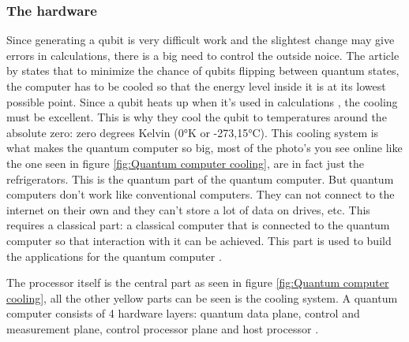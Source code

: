 \subsubsection{The hardware}
Since generating a qubit is very difficult work and the slightest change may give errors in calculations, there is a big need to control the outside noice.
The article by \textcite{Cooling} states that to minimize the chance of qubits flipping between quantum states, the computer has to be cooled so that the energy level inside it is at its lowest possible point.
Since a qubit heats up when it's used in calculations \autocite{Cooling}, the cooling must be excellent. This is why they cool the qubit to temperatures around the absolute zero: zero degrees Kelvin (0°K or -273,15°C).
This cooling system is what makes the quantum computer so big, most of the photo's you see online like the one seen in figure \ref{fig:Quantum computer cooling}, are in fact just the refrigerators. This is the quantum part of the quantum computer. But quantum computers don't work like conventional computers. They can not connect to the internet on their own and they can't store a lot of data on drives, etc.
This requires a classical part: a classical computer that is connected to the quantum computer so that interaction with it can be achieved. This part is used to build the applications for the quantum computer \autocite{qhardware}.

The processor itself is the central part as seen in figure \ref*{fig:Quantum computer cooling}, all the other yellow parts can be seen is the cooling system.
A quantum computer consists of 4 hardware layers: quantum data plane, control and measurement plane, control processor plane and host processor \autocite{qhardware}.

